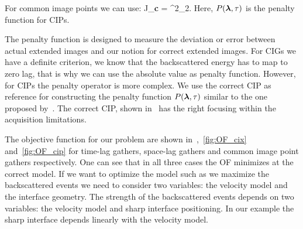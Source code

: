 For common image points we can use:
\beq
J_{\bf c} =   ^2_2.
\eeq
%
Here, $P({\boldsymbol{\lambda}},\tau)$ is the penalty function for CIPs.

The penalty function is designed to measure the deviation or error between actual extended images and our notion for correct 
extended images. For CIGs we have a definite criterion, we know that the backscattered energy has to map
to zero lag, that is why we can use the absolute value as penalty function. However, for CIPs the 
penalty operator is more complex. We use the correct CIP as reference for constructing the penalty function $P({\boldsymbol{\lambda}},\tau)$ similar
to the one proposed by~\citep{tony:cwp12}. The correct CIP, shown in~ has the right focusing within the acquisition limitations.

The objective function for our problem are shown in~,~\ref{fig:OF_cix} and~\ref{fig:OF_cip} for time-lag gathers, space-lag gathers and
common image point gathers respectively. One can see that in all three cases the OF minimizes at the correct model. If we want to optimize the model such as 
we maximize the backscattered events we need to consider two variables: the velocity model and the interface geometry. The strength of the backscattered
events depends on two variables: the velocity model and sharp interface positioning. In our example the sharp interface depends linearly with the 
velocity model.



